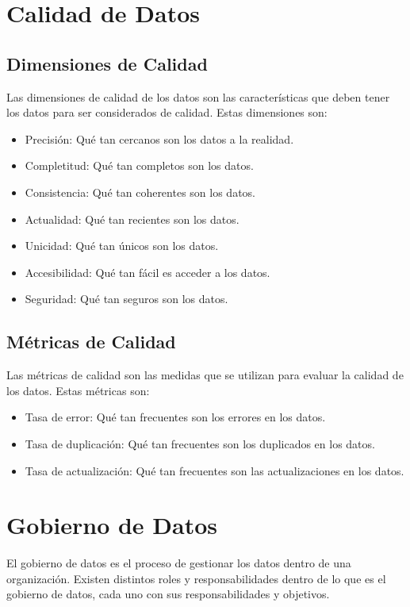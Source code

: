 \documentclass[12pt]{article}
\begin{document}
\section{Calidad de Datos}

\subsection{Dimensiones de Calidad}
Las dimensiones de calidad de los datos son las características que deben tener los datos para ser considerados de calidad. Estas dimensiones son:

\begin{itemize}
    \item Precisión: Qué tan cercanos son los datos a la realidad.
    \item Completitud: Qué tan completos son los datos.
    \item Consistencia: Qué tan coherentes son los datos.
    \item Actualidad: Qué tan recientes son los datos.
    \item Unicidad: Qué tan únicos son los datos.
    \item Accesibilidad: Qué tan fácil es acceder a los datos.
    \item Seguridad: Qué tan seguros son los datos.
\end{itemize}

\subsection{Métricas de Calidad}
Las métricas de calidad son las medidas que se utilizan para evaluar la calidad de los datos. Estas métricas son:

\begin{itemize}
    \item Tasa de error: Qué tan frecuentes son los errores en los datos.
    \item Tasa de duplicación: Qué tan frecuentes son los duplicados en los datos.
    \item Tasa de actualización: Qué tan frecuentes son las actualizaciones en los datos.
\end{itemize}

\section{Gobierno de Datos}
El gobierno de datos es el proceso de gestionar los datos dentro de una organización. Existen distintos roles y responsabilidades dentro de lo que es el gobierno de datos, cada uno con sus responsabilidades y objetivos.
\end{document}
